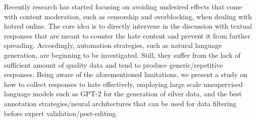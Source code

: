 Recently research has started focusing on avoiding undesired effects that come with content moderation, such as censorship and overblocking, when dealing with hatred online. The core idea is to directly intervene in the discussion with textual responses that are meant to counter the hate content and prevent it from further spreading. Accordingly, automation strategies, such as natural language generation, are beginning to be investigated. Still, they suffer from the lack of sufficient amount of quality data and tend to produce generic/repetitive responses. Being aware of the aforementioned limitations, we present a study on how to collect responses to hate effectively, employing large scale unsupervised language models such as GPT-2 for the generation of silver data, and the best annotation strategies/neural architectures that can be used for data filtering before expert validation/post-editing.
